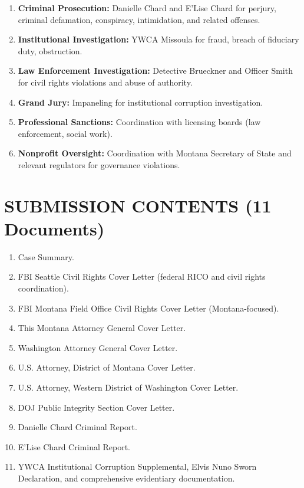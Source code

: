 \documentclass[12pt,oneside]{article}
\begin{document}
\begin{flushleft}
\begin{enumerate}
\item \textbf{Criminal Prosecution:} Danielle Chard and E'Lise Chard for perjury, criminal defamation, conspiracy, intimidation, and related offenses.
\item \textbf{Institutional Investigation:} YWCA Missoula for fraud, breach of fiduciary duty, obstruction.
\item \textbf{Law Enforcement Investigation:} Detective Brueckner and Officer Smith for civil rights violations and abuse of authority.
\item \textbf{Grand Jury:} Impaneling for institutional corruption investigation.
\item \textbf{Professional Sanctions:} Coordination with licensing boards (law enforcement, social work).
\item \textbf{Nonprofit Oversight:} Coordination with Montana Secretary of State and relevant regulators for governance violations.
\end{enumerate}

\section*{SUBMISSION CONTENTS (11 Documents)}

\begin{enumerate}
\item Case Summary.
\item FBI Seattle Civil Rights Cover Letter (federal RICO and civil rights coordination).
\item FBI Montana Field Office Civil Rights Cover Letter (Montana-focused).
\item This Montana Attorney General Cover Letter.
\item Washington Attorney General Cover Letter.
\item U.S. Attorney, District of Montana Cover Letter.
\item U.S. Attorney, Western District of Washington Cover Letter.
\item DOJ Public Integrity Section Cover Letter.
\item Danielle Chard Criminal Report.
\item E'Lise Chard Criminal Report.
\item YWCA Institutional Corruption Supplemental, Elvis Nuno Sworn Declaration, and comprehensive evidentiary documentation.
\end{enumerate}


\end{flushleft}
\end{document}
